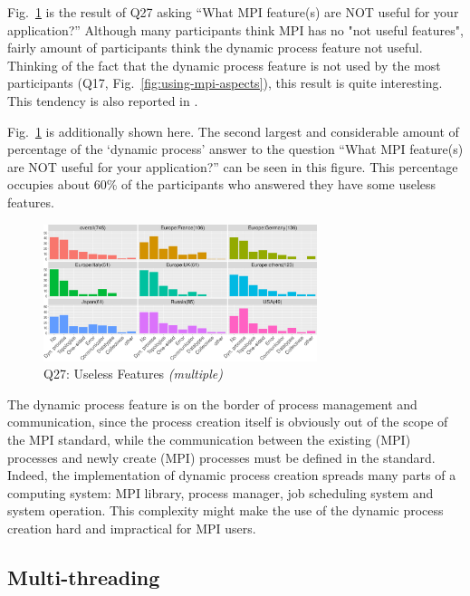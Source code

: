 \documentclass[conference,10pt,letterpaper]{IEEEtran}
\def\myquote#1{`#1'}
\begin{document}
Fig.~\ref{fig:useless-features} is the result of Q27 asking ``What MPI
feature(s) are NOT useful for your application?'' Although many
participants think MPI has no "not useful features", fairly amount of
participants think the dynamic process feature not useful. Thinking
of the fact that the dynamic process feature is not used by the most
participants (Q17, Fig.~\ref{fig:using-mpi-aspects}), this result is
quite interesting.
This tendency is also reported in \cite{10.1145/3295500.3356176}.

Fig.~\ref{fig:useless-features} is additionally shown here. The second
largest and considerable amount of percentage of the \myquote{dynamic
  process} answer to the question ``What MPI feature(s) are NOT useful
for your application?'' can be seen in this figure. This percentage
occupies about 60\% of the participants who answered they have
some useless features.

\begin{figure}[htb]
  \begin{center}
    \includegraphics[width=8cm]{R-scripts/Q27.pdf}
    \caption{Q27: Useless Features {\it(multiple)}}
    \label{fig:useless-features}
  \end{center}
\end{figure}

The dynamic process feature is on the
border of process management and communication, since the process
creation itself is obviously out of the scope of the MPI standard,
while the communication between the existing (MPI) processes and newly
create (MPI) processes must be defined in the standard. Indeed, the
implementation of dynamic process creation spreads many parts of a
computing system: MPI library, process manager, job scheduling system
and system operation. This complexity might make the use of the
dynamic process creation hard and impractical for MPI users. 

\subsection{Multi-threading}
\end{document}
